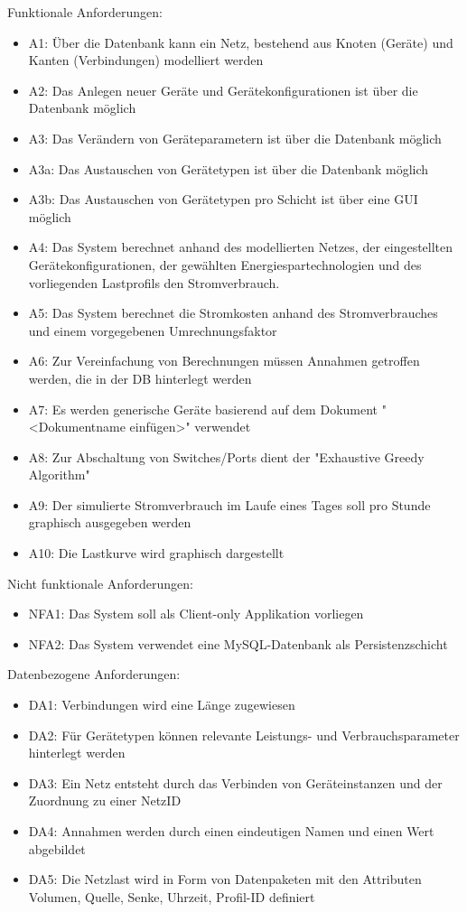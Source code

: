 Funktionale Anforderungen:
\begin{itemize}
	\item A1: Über die Datenbank kann ein Netz, bestehend aus Knoten (Geräte) und Kanten (Verbindungen) modelliert werden
	\item A2: Das Anlegen neuer Geräte und Geräte\-konfi\-gura\-tionen ist über die Datenbank möglich
	\item A3: Das Verändern von Geräteparametern ist über die Datenbank möglich
	\item A3a: Das Austauschen von Gerätetypen ist über die Datenbank möglich
	\item A3b: Das Austauschen von Gerätetypen pro Schicht ist über eine GUI möglich                       
	\item A4: Das System berechnet anhand des modellierten Netzes, der eingestellten		 Gerätekonfigurationen, der gewählten Energiespartechnologien und des vorliegenden Lastprofils den Stromverbrauch.
	\item A5: Das System berechnet die Stromkosten anhand des Stromverbrauches und einem vorgegebenen Umrechnungsfaktor 
	\item A6: Zur Vereinfachung von Berechnungen müssen Annahmen getroffen werden, die in der DB hinterlegt werden
	\item A7: Es werden generische Geräte basierend auf dem Dokument "<Dokumentname einfügen>" verwendet
	\item A8: Zur Abschaltung von Switches/Ports dient der "Exhaustive Greedy Algorithm"
	\item A9: Der simulierte Stromverbrauch im Laufe eines Tages soll pro Stunde graphisch ausgegeben werden
	\item A10: Die Lastkurve wird graphisch dargestellt
\end{itemize}


Nicht funktionale Anforderungen:
\begin{itemize}
	\item NFA1: Das System soll als Client-only Applikation vorliegen
	\item NFA2: Das System verwendet eine MySQL-Datenbank als Persistenzschicht
\end{itemize}


Datenbezogene Anforderungen:
\begin{itemize}
	\item DA1: Verbindungen wird eine Länge zugewiesen
	\item DA2: Für Gerätetypen können relevante Leistungs- und Verbrauchsparameter hinterlegt werden
	\item DA3: Ein Netz entsteht durch das Verbinden von Geräteinstanzen und der Zuordnung zu einer NetzID
	\item DA4: Annahmen werden durch einen eindeutigen Namen und einen Wert abgebildet
	\item DA5:  Die Netzlast wird in Form von Datenpaketen mit den Attributen Volumen, Quelle, Senke, Uhrzeit, Profil-ID definiert
\end{itemize}


